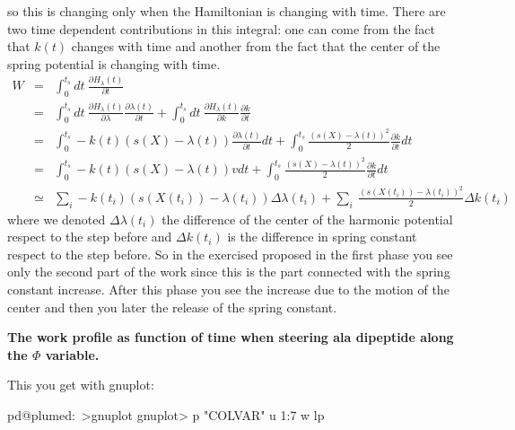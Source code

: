 so this is changing only when the Hamiltonian is changing with time. There are two time dependent contributions in this integral\+: one can come from the fact that $ k(t) $ changes with time and another from the fact that the center of the spring potential is changing with time. \begin{eqnarray*} W&=&\int_0^{t_s}dt\ \frac{\partial H_\lambda(t)}{\partial t}\\ &=&\int_0^{t_s}dt\ \frac{\partial H_\lambda(t)}{\partial \lambda} \frac{\partial \lambda(t)}{\partial t} + \int_0^{t_s}dt\ \frac{\partial H_\lambda(t)}{\partial k} \frac{\partial k}{\partial t} \\ &=& \int_0^{t_s} -k(t)( s(X)-\lambda(t)) \frac{\partial \lambda(t)}{\partial t} dt + \int_0^{t_s} \frac{( s(X)-\lambda(t))^2}{2}\frac{\partial k}{\partial t} dt \\ &=& \int_0^{t_s} - k(t)( s(X)-\lambda(t)) v dt + \int_0^{t_s} \frac{( s(X)-\lambda(t))^2}{2}\frac{\partial k}{\partial t} dt \\ &\simeq& \sum_i - k(t_i)( s(X(t_i))-\lambda(t_i)) \Delta \lambda(t_i) + \sum_i\ \frac{( s(X(t_i))-\lambda(t_i))^2}{2} \Delta k(t_i) \end{eqnarray*} where we denoted $ \Delta \lambda(t_i) $ the difference of the center of the harmonic potential respect to the step before and $ \Delta k(t_i) $ is the difference in spring constant respect to the step before. So in the exercised proposed in the first phase you see only the second part of the work since this is the part connected with the spring constant increase. After this phase you see the increase due to the motion of the center and then you later the release of the spring constant.

\label{belfast-5_belfast-5-work-1-fig}%
\hypertarget{belfast-5_belfast-5-work-1-fig}{}%
 \begin{center} {\bfseries  The work profile as function of time when steering ala dipeptide along the $ \Phi $ variable. } \end{center} 

This you get with gnuplot\+:

\begin{DoxyVerb}pd@plumed:~>gnuplot
gnuplot>  p "COLVAR" u 1:7 w lp  
\end{DoxyVerb}


